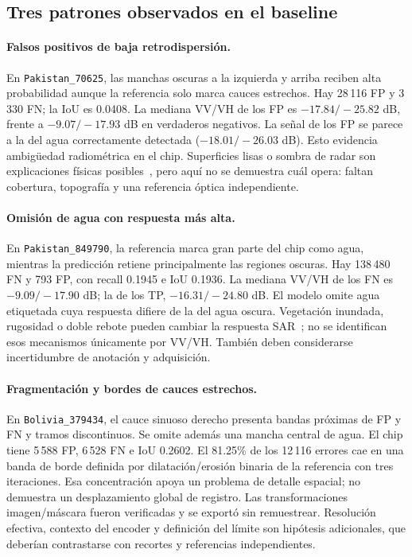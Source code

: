 \subsection{Tres patrones observados en el baseline}
\paragraph{Falsos positivos de baja retrodispersión.}
En \texttt{Pakistan\_70625}, las manchas oscuras a la izquierda y arriba reciben alta
probabilidad aunque la referencia solo marca cauces estrechos. Hay 28\,116 FP y
3\,330 FN; la IoU es 0.0408. La mediana VV/VH de los FP es $-17.84/-25.82$ dB,
frente a $-9.07/-17.93$ dB en verdaderos negativos. La señal de los FP se parece a
la del agua correctamente detectada ($-18.01/-26.03$ dB). Esto evidencia ambigüedad
radiométrica en el chip. Superficies lisas o sombra de radar son explicaciones físicas
posibles~\cite{sarhandbook}, pero aquí no se demuestra cuál opera: faltan cobertura,
topografía y una referencia óptica independiente.

\paragraph{Omisión de agua con respuesta más alta.}
En \texttt{Pakistan\_849790}, la referencia marca gran parte del chip como agua,
mientras la predicción retiene principalmente las regiones oscuras. Hay 138\,480 FN
y 793 FP, con recall 0.1945 e IoU 0.1936. La mediana VV/VH de los FN es
$-9.09/-17.90$ dB; la de los TP, $-16.31/-24.80$ dB. El modelo omite agua etiquetada
cuya respuesta difiere de la del agua oscura. Vegetación inundada, rugosidad o doble rebote
pueden cambiar la respuesta SAR~\cite{sarhandbook}; no se identifican esos mecanismos
únicamente por VV/VH. También deben considerarse incertidumbre de anotación y adquisición.

\paragraph{Fragmentación y bordes de cauces estrechos.}
En \texttt{Bolivia\_379434}, el cauce sinuoso derecho presenta bandas próximas de FP y FN
y tramos discontinuos. Se omite además una mancha central de agua. El chip tiene 5\,588 FP,
6\,528 FN e IoU 0.2602. El 81.25\% de los 12\,116 errores cae en una banda de borde
definida por dilatación/erosión binaria de la referencia con tres iteraciones.
Esa concentración apoya un problema de detalle espacial; no demuestra un desplazamiento
global de registro. Las transformaciones imagen/máscara fueron verificadas y se exportó
sin remuestrear. Resolución efectiva, contexto del encoder y definición del límite son
hipótesis adicionales, que deberían contrastarse con recortes y referencias independientes.


